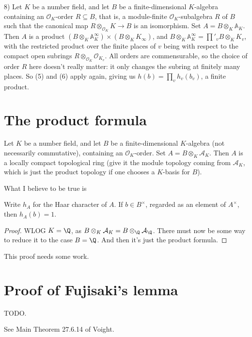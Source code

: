 8) Let $K$ be a number field, and let $B$ be a finite-dimensional $K$-algebra containing
an $\mathcal{O}_K$-order $R\subseteq B$, that is, a module-finite $\mathcal{O}_K$-subalgebra
$R$ of $B$ such that the canonical map $R\otimes_{\mathcal{O}_K}K\to B$ is an isomorphism.
Set $A=B\otimes_K\mathbb{A}_K$. Then $A$ is a product
$(B\otimes_K\mathbb{A}_K^\infty)\times(B\otimes_KK_\infty)$, and
$B\otimes_K\mathbb{A}_K^\infty=\prod'_vB\otimes_KK_v$, with the restricted product over
the finite places of $v$ being with respect to the compact open subrings
$R\otimes_{\mathcal{O}_K}\mathcal{O}_{K_v}$. All orders are commensurable, so the choice
of order $R$ here doesn't really matter: it only changes the subring at finitely many places.
So (5) and (6) apply again, giving us $h(b)=\prod_v h_v(b_v)$, a finite product.

\section{The product formula}

Let $K$ be a number field, and let $B$ be a finite-dimensional $K$-algebra (not necessarily
commutative), containing an $\mathcal{O}_K$-order. Set $A=B\otimes_K\mathcal{A}_K$.
Then $A$ is a locally compact topological ring (give it the module topology coming from
$\mathcal{A}_K$, which is just the product topology if one chooses a $K$-basis for $B$).

What I believe to be true is

\begin{theorem} Write $h_A$ for the Haar character of $A$.
  If $b\in B^\times$, regarded as an element of $A^\times$, then $h_A(b)=1.$
\end{theorem}
\begin{proof} WLOG $K=\Q$, as $B\otimes_K\mathcal{A}_K=B\otimes_{\Q}\mathcal{A}_{\Q}$.
  There must now be some way to reduce it to the case $B=\Q$. And then it's just
  the product formula.
\end{proof}

This proof needs some work.

\section{Proof of Fujisaki's lemma}

TODO.

See Main Theorem 27.6.14 of Voight.
